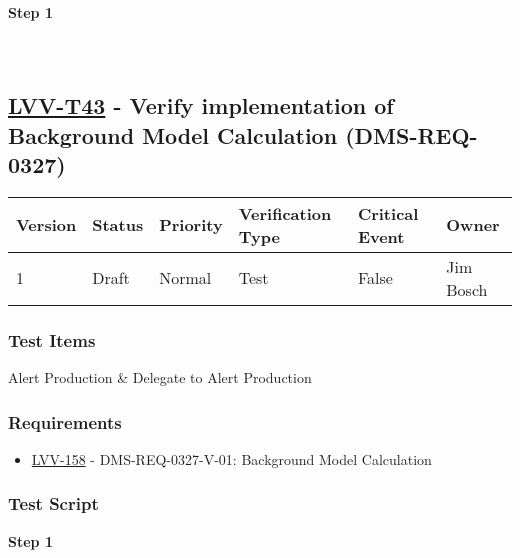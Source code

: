 \textbf{Step 1}\\
~\\
~\\

\hypertarget{lvv-t43---verify-implementation-of-background-model-calculation-dms-req-0327}{%
\subsection{\texorpdfstring{\href{https://jira.lsstcorp.org/secure/Tests.jspa\#/testCase/LVV-T43}{LVV-T43}
- Verify implementation of Background Model Calculation
(DMS-REQ-0327)}{LVV-T43 - Verify implementation of Background Model Calculation (DMS-REQ-0327)}}\label{lvv-t43---verify-implementation-of-background-model-calculation-dms-req-0327}}

\begin{longtable}[]{@{}llllll@{}}
\toprule
Version & Status & Priority & Verification Type & Critical Event &
Owner\tabularnewline
\midrule
\endhead
1 & Draft & Normal & Test & False & Jim Bosch\tabularnewline
\bottomrule
\end{longtable}

\hypertarget{test-items-19}{%
\subsubsection{Test Items}\label{test-items-19}}

Alert Production \& Delegate to Alert Production

\hypertarget{requirements-20}{%
\subsubsection{Requirements}\label{requirements-20}}

\begin{itemize}
\tightlist
\item
  \href{https://jira.lsstcorp.org/browse/LVV-158}{LVV-158} -
  DMS-REQ-0327-V-01: Background Model Calculation
\end{itemize}

\hypertarget{test-script-20}{%
\subsubsection{Test Script}\label{test-script-20}}

\textbf{Step 1}\\
~\\
~\\

